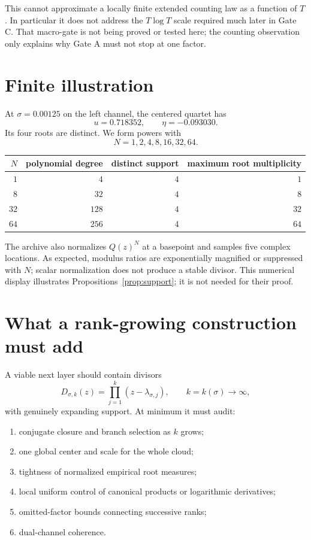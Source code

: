 \documentclass[12pt]{article}
\theoremstyle{remark}\newtheorem{remark}[theorem]{Remark}
\begin{document}
This cannot approximate a locally finite extended counting law as a function
of $T$.  In particular it does not address the $T\log T$ scale required much
later in Gate C.  That macro-gate is not being proved or tested here; the
counting observation only explains why Gate A must not stop at one factor.

\section{Finite illustration}

At $\sigma=0.00125$ on the left channel, the centered quartet has
\begin{equation}
 u=0.718352,\qquad \eta=-0.093030.
\end{equation}
Its four roots are distinct.  We form powers with
\begin{equation}
 N=1,2,4,8,16,32,64.
\end{equation}

\begin{center}
\begin{tabular}{rrrr}
\toprule
$N$ & polynomial degree & distinct support & maximum root multiplicity\\
\midrule
$1$ & $4$ & $4$ & $1$\\
$8$ & $32$ & $4$ & $8$\\
$32$ & $128$ & $4$ & $32$\\
$64$ & $256$ & $4$ & $64$\\
\bottomrule
\end{tabular}
\end{center}

The archive also normalizes $Q(z)^N$ at a basepoint and samples five complex
locations.  As expected, modulus ratios are exponentially magnified or
suppressed with $N$; scalar normalization does not produce a stable divisor.
This numerical display illustrates Propositions~\ref{prop:support}; it is not
needed for their proof.

\section{What a rank-growing construction must add}

A viable next layer should contain divisors
\begin{equation}\label{eq:growing}
 D_{\sigma,k}(z)=\prod_{j=1}^{k}(z-\lambda_{\sigma,j}),
 \qquad k=k(\sigma)\longrightarrow\infty,
\end{equation}
with genuinely expanding support.  At minimum it must audit:
\begin{enumerate}[leftmargin=2em]
\item conjugate closure and branch selection as $k$ grows;
\item one global center and scale for the whole cloud;
\item tightness of normalized empirical root measures;
\item local uniform control of canonical products or logarithmic derivatives;
\item omitted-factor bounds connecting successive ranks;
\item dual-channel coherence.
\end{enumerate}
\end{document}
